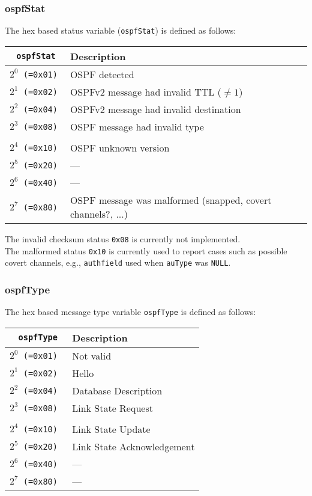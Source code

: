 \documentclass[documentation]{subfiles}
\begin{document}
\subsubsection{ospfStat}\label{ospfStat}
The hex based status variable ({\tt ospfStat}) is defined as follows:
\begin{longtable}{>{\tt}rl}
    \toprule
    {\bf ospfStat} & {\bf Description} \\
    \midrule\endhead%
    $2^0$ (=0x01)  & OSPF detected\\
    $2^1$ (=0x02)  & OSPFv2 message had invalid TTL ($\neq1$)\\
    $2^2$ (=0x04)  & OSPFv2 message had invalid destination\\
    $2^3$ (=0x08)  & OSPF message had invalid type\\
    \\
    $2^4$ (=0x10)  & OSPF unknown version\\
    $2^5$ (=0x20)  & ---\\ %
    $2^6$ (=0x40)  & ---\\
    $2^7$ (=0x80)  & OSPF message was malformed (snapped, covert channels?, ...)\\
    \bottomrule
\end{longtable}

The invalid checksum status {\tt 0x08} is currently not implemented.\\
The malformed status {\tt 0x10} is currently used to report cases such as possible covert channels, e.g., {\tt authfield} used when {\tt auType} was {\tt NULL}.\\

\subsubsection{ospfType}\label{ospfType}
The hex based message type variable {\tt ospfType} is defined as follows:
\begin{longtable}{>{\tt}rl}
    \toprule
    {\bf ospfType} & {\bf Description} \\
    \midrule\endhead%
    $2^0$ (=0x01)  & Not valid\\
    $2^1$ (=0x02)  & Hello\\
    $2^2$ (=0x04)  & Database Description\\
    $2^3$ (=0x08)  & Link State Request\\
    \\
    $2^4$ (=0x10)  & Link State Update\\
    $2^5$ (=0x20)  & Link State Acknowledgement\\
    $2^6$ (=0x40)  & ---\\
    $2^7$ (=0x80)  & ---\\
    \bottomrule
\end{longtable}
\end{document}
